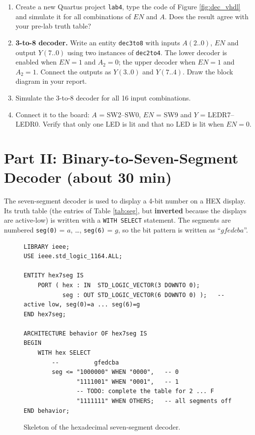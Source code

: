 \documentclass{article}
\begin{document}
\begin{enumerate}
    \item Create a new Quartus project \texttt{lab4}, type the code of Figure \ref{fig:dec_vhdl} and simulate it for all combinations of $EN$ and $A$. Does the result agree with your pre-lab truth table?
    \item \textbf{3-to-8 decoder.} Write an entity \texttt{dec3to8} with inputs $A(2..0)$, $EN$ and output $Y(7..0)$ using two instances of \texttt{dec2to4}. The lower decoder is enabled when $EN=1$ and $A_2=0$; the upper decoder when $EN=1$ and $A_2=1$. Connect the outputs as $Y(3..0)$ and $Y(7..4)$. Draw the block diagram in your report.
    \item Simulate the 3-to-8 decoder for all 16 input combinations.
    \item Connect it to the board: $A$ = SW2--SW0, $EN$ = SW9 and $Y$ = LEDR7--LEDR0. Verify that only one LED is lit and that no LED is lit when $EN = 0$.
\end{enumerate}

\section*{Part II: Binary-to-Seven-Segment Decoder (about 30 min)}

The seven-segment decoder is used to display a 4-bit number on a HEX display. Its truth table (the entries of Table \ref{tab:seg}, but \textbf{inverted} because the displays are active-low) is written with a \texttt{WITH SELECT} statement. The segments are numbered \texttt{seg(0)} = $a$, \ldots, \texttt{seg(6)} = $g$, so the bit pattern is written as ``$gfedcba$''.

\begin{figure}[H]
    \centering
    \begin{verbatim}
LIBRARY ieee;
USE ieee.std_logic_1164.ALL;

ENTITY hex7seg IS
    PORT ( hex : IN  STD_LOGIC_VECTOR(3 DOWNTO 0);
           seg : OUT STD_LOGIC_VECTOR(6 DOWNTO 0) );   -- active low, seg(0)=a ... seg(6)=g
END hex7seg;

ARCHITECTURE behavior OF hex7seg IS
BEGIN
    WITH hex SELECT
        --          gfedcba
        seg <= "1000000" WHEN "0000",   -- 0
               "1111001" WHEN "0001",   -- 1
               -- TODO: complete the table for 2 ... F
               "1111111" WHEN OTHERS;   -- all segments off
END behavior;
    \end{verbatim}
    \caption{Skeleton of the hexadecimal seven-segment decoder.}
    \label{fig:hex7seg}
\end{figure}
\end{document}
